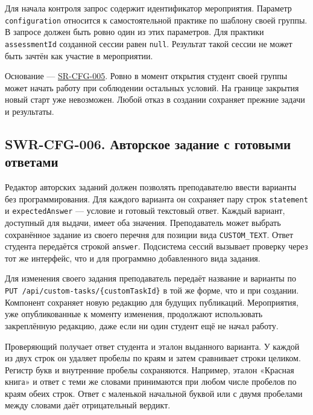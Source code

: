 \documentclass[12pt,a4paper]{article}
\begin{document}
Для начала контроля запрос содержит идентификатор мероприятия. Параметр \texttt{configuration} относится к самостоятельной практике по шаблону своей группы. В запросе должен быть ровно один из этих параметров. Для практики \texttt{assessment\allowbreak{}Id} созданной сессии равен \texttt{null}. Результат такой сессии не может быть зачтён как участие в мероприятии.

Основание --- {\href{../04\_Системные\_требования/DOC-05\_Системные\_требования.pdf\#sr-cfg-005}{SR-CFG-005}}. Ровно в момент открытия студент своей группы может начать работу при соблюдении остальных условий. На границе закрытия новый старт уже невозможен. Любой отказ в создании сохраняет прежние задачи и результаты.

\subsection{SWR-CFG-006. Авторское задание с готовыми ответами}\label{swr-cfg-006-ux430ux432ux442ux43eux440ux441ux43aux43eux435-ux437ux430ux434ux430ux43dux438ux435-ux441-ux433ux43eux442ux43eux432ux44bux43cux438-ux43eux442ux432ux435ux442ux430ux43cux438}

\hypertarget{swr-cfg-006-авторское-задание-с-готовыми-ответами}{}

\hypertarget{swr-cfg-006}{}

Редактор авторских заданий должен позволять преподавателю ввести варианты без программирования. Для каждого варианта он сохраняет пару строк \texttt{statement} и \texttt{expected\allowbreak{}Answer} --- условие и готовый текстовый ответ. Каждый вариант, доступный для выдачи, имеет оба значения. Преподаватель может выбрать сохранённое задание из своего перечня для позиции вида \texttt{CUSTOM\_\allowbreak{}TEXT}. Ответ студента передаётся строкой \texttt{answer}. Подсистема сессий вызывает проверку через тот же интерфейс, что и для программно добавленного вида задания.

Для изменения своего задания преподаватель передаёт название и варианты по \texttt{PUT /\allowbreak{}api/\allowbreak{}custom-\allowbreak{}tasks/\allowbreak{}\{custom\allowbreak{}Task\allowbreak{}Id\}} в той же форме, что и при создании. Компонент сохраняет новую редакцию для будущих публикаций. Мероприятия, уже опубликованные к моменту изменения, продолжают использовать закреплённую редакцию, даже если ни один студент ещё не начал работу.

Проверяющий получает ответ студента и эталон выданного варианта. У каждой из двух строк он удаляет пробелы по краям и затем сравнивает строки целиком. Регистр букв и внутренние пробелы сохраняются. Например, эталон «Красная книга» и ответ с теми же словами принимаются при любом числе пробелов по краям обеих строк. Ответ с маленькой начальной буквой или с двумя пробелами между словами даёт отрицательный вердикт.
\end{document}
